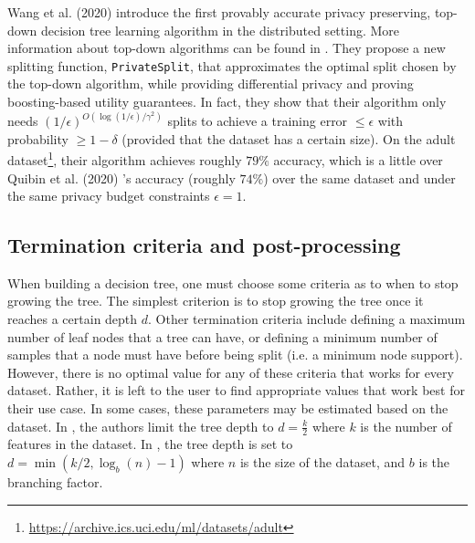 Wang et al. (2020) \cite{wen_wang} introduce the first provably accurate privacy preserving, top-down decision tree learning algorithm in the distributed setting. More information about top-down algorithms can be found in \cite{kearns}. They propose a new splitting function, \texttt{PrivateSplit}, that approximates the optimal split chosen by the top-down algorithm, while providing differential privacy and proving boosting-based utility guarantees. In fact, they show that their algorithm only needs $(1/\epsilon)^{O(\log(1/\epsilon)/\gamma^2)}$ splits to achieve a training error $\leq \epsilon$ with probability $\geq 1-\delta$ (provided that the dataset has a certain size). On the adult dataset\footnote{\href{https://archive.ics.uci.edu/ml/datasets/adult}{https://archive.ics.uci.edu/ml/datasets/adult}}, their algorithm achieves roughly $79\%$ accuracy, which is a little over Quibin et al. (2020) \cite{dpgbdt}'s accuracy (roughly $74\%$) over the same dataset and under the same privacy budget constraints $\epsilon = 1$.

\subsection{Termination criteria and post-processing}

When building a decision tree, one must choose some criteria as to when to stop growing the tree. The simplest criterion is to stop growing the tree once it reaches a certain depth $d$. Other termination criteria include defining a maximum number of leaf nodes that a tree can have, or defining a minimum number of samples that a node must have before being split (i.e. a minimum node support). However, there is no optimal value for any of these criteria that works for every dataset. Rather, it is left to the user to find appropriate values that work best for their use case. In some cases, these parameters may be estimated based on the dataset. In \cite{fan}, the authors limit the tree depth to $d = \frac{k}{2}$ where $k$ is the number of features in the dataset. In \cite{jagannathan}, the tree depth is set to $d = \min(k/2, \log_b(n) - 1)$ where $n$ is the size of the dataset, and $b$ is the branching factor.

